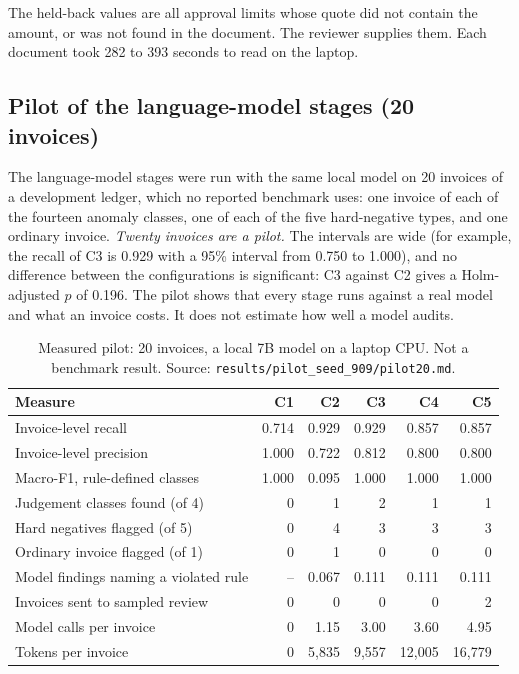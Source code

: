 \documentclass[11pt,a4paper]{article}
\begin{document}
The held-back values are all approval limits whose quote did not contain the amount, or was not found in the document. The reviewer supplies them. Each document took 282 to 393 seconds to read on the laptop.

\subsection{Pilot of the language-model stages (20 invoices)}
\label{sec:pilot}
The language-model stages were run with the same local model on 20 invoices of a development ledger, which no reported benchmark uses: one invoice of each of the fourteen anomaly classes, one of each of the five hard-negative types, and one ordinary invoice. \emph{Twenty invoices are a pilot.} The intervals are wide (for example, the recall of C3 is 0.929 with a 95\% interval from 0.750 to 1.000), and no difference between the configurations is significant: C3 against C2 gives a Holm-adjusted $p$ of 0.196. The pilot shows that every stage runs against a real model and what an invoice costs. It does not estimate how well a model audits.

\begin{table}[htbp]
\caption{Measured pilot: 20 invoices, a local 7B model on a laptop CPU. Not a benchmark result. Source: \texttt{results/pilot\_seed\_909/pilot20.md}.}
\label{tab:pilot}
\centering
\small
\begin{tabular}{L{6.0cm}rrrrr}
\toprule
Measure & C1 & C2 & C3 & C4 & C5 \\
\midrule
Invoice-level recall & 0.714 & 0.929 & 0.929 & 0.857 & 0.857 \\
Invoice-level precision & 1.000 & 0.722 & 0.812 & 0.800 & 0.800 \\
Macro-F1, rule-defined classes & 1.000 & 0.095 & 1.000 & 1.000 & 1.000 \\
Judgement classes found (of 4) & 0 & 1 & 2 & 1 & 1 \\
Hard negatives flagged (of 5) & 0 & 4 & 3 & 3 & 3 \\
Ordinary invoice flagged (of 1) & 0 & 1 & 0 & 0 & 0 \\
Model findings naming a violated rule & -- & 0.067 & 0.111 & 0.111 & 0.111 \\
Invoices sent to sampled review & 0 & 0 & 0 & 0 & 2 \\
Model calls per invoice & 0 & 1.15 & 3.00 & 3.60 & 4.95 \\
Tokens per invoice & 0 & 5,835 & 9,557 & 12,005 & 16,779 \\
\bottomrule
\end{tabular}
\end{table}
\end{document}
